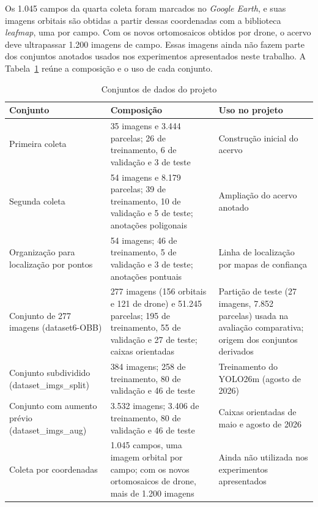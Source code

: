 Os 1.045 campos da quarta coleta foram marcados no \textit{Google Earth}, e suas imagens orbitais s\~ao obtidas a partir dessas coordenadas com a biblioteca \textit{leafmap}, uma por campo. Com os novos ortomosaicos obtidos por drone, o acervo deve ultrapassar 1.200 imagens de campo. Essas imagens ainda n\~ao fazem parte dos conjuntos anotados usados nos experimentos apresentados neste trabalho. A Tabela~\ref{tab:conjuntos-dados} re\'une a composi\c{c}\~ao e o uso de cada conjunto.

\begin{table}[htb]
\centering
\caption{Conjuntos de dados do projeto}
\label{tab:conjuntos-dados}
\small
\begin{tabular}{p{3.3cm}p{5.7cm}p{5.7cm}}
\hline
\textbf{Conjunto} & \textbf{Composi\c{c}\~ao} & \textbf{Uso no projeto} \\
\hline
Primeira coleta & 35 imagens e 3.444 parcelas; 26 de treinamento, 6 de valida\c{c}\~ao e 3 de teste & Constru\c{c}\~ao inicial do acervo \\
Segunda coleta & 54 imagens e 8.179 parcelas; 39 de treinamento, 10 de valida\c{c}\~ao e 5 de teste; anota\c{c}\~oes poligonais & Amplia\c{c}\~ao do acervo anotado \\
Organiza\c{c}\~ao para localiza\c{c}\~ao por pontos & 54 imagens; 46 de treinamento, 5 de valida\c{c}\~ao e 3 de teste; anota\c{c}\~oes pontuais & Linha de localiza\c{c}\~ao por mapas de confian\c{c}a \\
Conjunto de 277 imagens (dataset6-OBB) & 277 imagens (156 orbitais e 121 de drone) e 51.245 parcelas; 195 de treinamento, 55 de valida\c{c}\~ao e 27 de teste; caixas orientadas & Parti\c{c}\~ao de teste (27 imagens, 7.852 parcelas) usada na avalia\c{c}\~ao comparativa; origem dos conjuntos derivados \\
Conjunto subdividido (dataset\_imgs\_split) & 384 imagens; 258 de treinamento, 80 de valida\c{c}\~ao e 46 de teste & Treinamento do YOLO26m (agosto de 2026) \\
Conjunto com aumento pr\'evio (dataset\_imgs\_aug) & 3.532 imagens; 3.406 de treinamento, 80 de valida\c{c}\~ao e 46 de teste & Caixas orientadas de maio e agosto de 2026 \\
Coleta por coordenadas & 1.045 campos, uma imagem orbital por campo; com os novos ortomosaicos de drone, mais de 1.200 imagens & Ainda n\~ao utilizada nos experimentos apresentados \\
\hline
\end{tabular}
\end{table}

